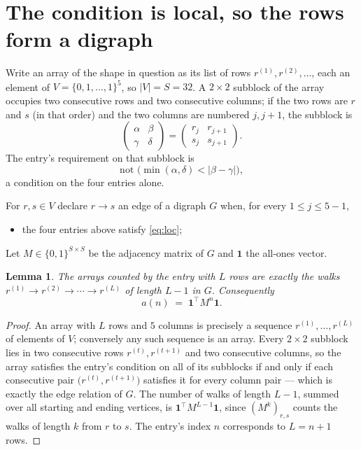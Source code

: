 \documentclass[11pt,a4paper]{article}
\theoremstyle{plain}
\newtheorem{lemma}[theorem]{Lemma}
\theoremstyle{definition}
\begin{document}
\section{The condition is local, so the rows form a digraph}

Write an array of the shape in question as its list of rows
$r^{(1)},r^{(2)},\dots$, each an element of
$V=\{0,1,\dots,1\}^{5}$, so $|V|=S=32$. A $2\times2$ subblock of the array
occupies two consecutive rows and two consecutive columns; if the two rows are $r$
and $s$ (in that order) and the two columns are numbered $j,j+1$,
the subblock is
\[
\begin{pmatrix}\alpha&\beta\\\gamma&\delta\end{pmatrix}=\begin{pmatrix}r_j&r_{j+1}\\s_j&s_{j+1}\end{pmatrix}.
\]
The entry's requirement on that subblock is
\begin{equation}\label{eq:loc}
\text{not }\bigl(\min(\alpha,\delta)<|\beta-\gamma|\bigr),
\end{equation}
a condition on the four entries alone.

For $r,s\in V$ declare $r\to s$ an edge of a digraph $G$ when, for every
$1\le j\le 5-1$,
\begin{itemize}
\item the four entries above satisfy \eqref{eq:loc};

\end{itemize}
Let $M\in\{0,1\}^{S\times S}$ be the adjacency matrix of $G$ and $\mathbf{1}$ the
all-ones vector.

\begin{lemma}\label{lem:walk}
The arrays counted by the entry with $L$ rows are exactly the walks
$r^{(1)}\to r^{(2)}\to\cdots\to r^{(L)}$ of length $L-1$ in $G$. Consequently
\[
a(n)\;=\;\mathbf{1}^{\!\top}M^{n}\mathbf{1} .
\]
\end{lemma}

\begin{proof}
An array with $L$ rows and $5$ columns is precisely a sequence
$r^{(1)},\dots,r^{(L)}$ of elements of $V$; conversely any such sequence is an array.
Every $2\times2$ subblock lies in two consecutive rows $r^{(t)},r^{(t+1)}$ and two
consecutive columns, so the array satisfies the entry's condition on all of its subblocks
if and only if each consecutive pair $\bigl(r^{(t)},r^{(t+1)}\bigr)$ satisfies it for
every column pair --- which is exactly the edge relation of $G$. The number of walks of
length $L-1$, summed over all starting and ending vertices, is
$\mathbf{1}^{\!\top}M^{L-1}\mathbf{1}$, since $(M^{k})_{r,s}$ counts the walks of
length $k$ from $r$ to $s$. The entry's index $n$ corresponds to $L=n+1$ rows.
\end{proof}
\end{document}
